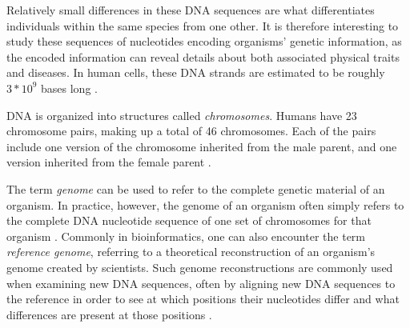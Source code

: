 Relatively small differences in these DNA sequences are what differentiates individuals within the same species from one other.
It is therefore interesting to study these sequences of nucleotides encoding organisms' genetic information, as the encoded information can reveal details about both associated physical traits and diseases.
In human cells, these DNA strands are estimated to be roughly $3 * 10^{9}$ bases long \cite[p.13]{singh}.

DNA is organized into structures called \textit{chromosomes}. 
Humans have 23 chromosome pairs, making up a total of 46 chromosomes.
Each of the pairs include one version of the chromosome inherited from the male parent, and one version inherited from the female parent \cite{nhgri_chromosome}.

The term \textit{genome} can be used to refer to the complete genetic material of an organism.
In practice, however, the genome of an organism often simply refers to the complete DNA nucleotide sequence of one set of chromosomes for that organism \cite[p.13]{singh}.
Commonly in bioinformatics, one can also encounter the term \textit{reference genome}, referring to a theoretical reconstruction of an organism's genome created by scientists.
Such genome reconstructions are commonly used when examining new DNA sequences, often by aligning new DNA sequences to the reference in order to see at which positions their nucleotides differ and what differences are present at those positions \cite{gatk}.

